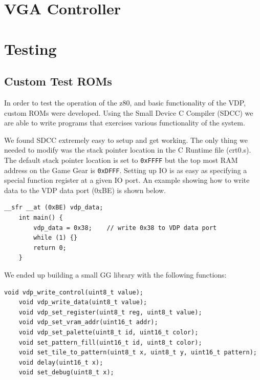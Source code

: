\documentclass{article}
\begin{document}
\section{VGA Controller}

\newpage
\section{Testing}
\subsection{Custom Test ROMs}

In order to test the operation of the z80, and basic functionality of the VDP,
custom ROMs were developed. Using the Small Device C Compiler (SDCC)
\cite{SDCC} we are able to write programs that exercises various functionality
of the system.

We found SDCC extremely easy to setup and get working. The only thing we needed
to modify was the stack pointer location in the C Runtime file (crt0.s). The
default stack pointer location is set to \texttt{0xFFFF} but the top most RAM
address on the Game Gear is \texttt{0xDFFF}. Setting up IO is as easy as
specifying a special function register at a given IO port. An example showing
how to write data to the VDP data port (0xBE) is shown below.

\begin{lstlisting}[caption=VDP Data Write]
    __sfr __at (0xBE) vdp_data;
    int main() {
        vdp_data = 0x38;    // write 0x38 to VDP data port
        while (1) {}
        return 0;
    }
\end{lstlisting}

We ended up building a small GG library with the following functions:

\begin{lstlisting}[caption=Game Gear Library Functions]
    void vdp_write_control(uint8_t value);
    void vdp_write_data(uint8_t value);
    void vdp_set_register(uint8_t reg, uint8_t value);
    void vdp_set_vram_addr(uint16_t addr);
    void vdp_set_palette(uint8_t id, uint16_t color);
    void set_pattern_fill(uint16_t id, uint8_t color);
    void set_tile_to_pattern(uint8_t x, uint8_t y, uint16_t pattern);
    void delay(uint16_t x);
    void set_debug(uint8_t x);
\end{lstlisting}
\end{document}
